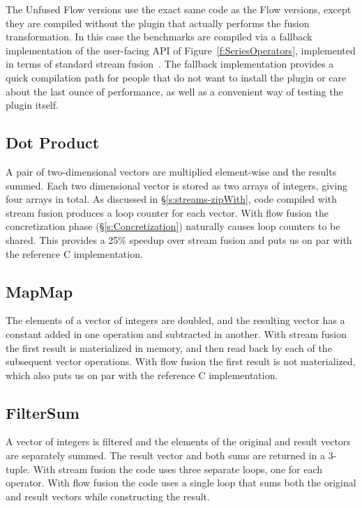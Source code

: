 The Unfused Flow versions use the exact same code as the Flow versions, except they are compiled without the plugin that actually performs the fusion transformation. In this case the benchmarks are compiled via a fallback implementation of the user-facing API of Figure~\ref{f:SeriesOperators}, implemented in terms of standard stream fusion~\cite{Coutts:stream-fusion}. The fallback implementation provides a quick compilation path for people that do not want to install the plugin or care about the last ounce of 
performance, as well as a convenient way of testing the plugin itself.


\subsection{Dot Product}
A pair of two-dimensional vectors are multiplied element-wise and the results summed. Each two dimensional vector is stored as two arrays of integers, giving four arrays in total. As discussed in \S\ref{s:streams-zipWith}, code compiled with stream fusion produces a loop counter for each vector. With flow fusion the concretization phase (\S\ref{s:Concretization}) naturally causes loop counters to be shared. This provides a 25\% speedup over stream fusion and puts us on par with the reference C implementation. 


\subsection{MapMap}
The elements of a vector of integers are doubled, and the resulting vector has a constant added in one operation and subtracted in another. With stream fusion the first result is materialized in memory, and then read back by each of the subsequent vector operations. With flow fusion the first result is not materialized, which also puts us on par with the reference C implementation.


\subsection{FilterSum}
A vector of integers is filtered and the elements of the original and result vectors are separately summed. The result vector and both sums are returned in a 3-tuple. With stream fusion the code uses three separate loops, one for each operator. With flow fusion the code uses a single loop that sums both the original and result vectors while constructing the result. 

